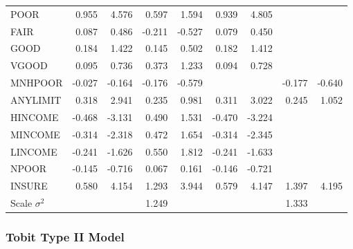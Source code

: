 \begin{table}[h]
\begin{tabular}{lrrrr|rrrr}
\hline
      POOR &      0.955 &      4.576 &      0.597 &      1.594 &      0.939 &      4.805 &            &            \\
      FAIR &      0.087 &      0.486 &     -0.211 &     -0.527 &      0.079 &      0.450 &            &            \\
      GOOD &      0.184 &      1.422 &      0.145 &      0.502 &      0.182 &      1.412 &            &            \\
     VGOOD &      0.095 &      0.736 &      0.373 &      1.233 &      0.094 &      0.728 &            &            \\
   MNHPOOR &     -0.027 &     -0.164 &     -0.176 &     -0.579 &            &            &     -0.177 &     -0.640 \\
  ANYLIMIT &      0.318 &      2.941 &      0.235 &      0.981 &      0.311 &      3.022 &      0.245 &      1.052 \\
  \hline
   HINCOME &     -0.468 &     -3.131 &      0.490 &      1.531 &     -0.470 &     -3.224 &            &            \\
   MINCOME &     -0.314 &     -2.318 &      0.472 &      1.654 &     -0.314 &     -2.345 &            &            \\
   LINCOME &     -0.241 &     -1.626 &      0.550 &      1.812 &     -0.241 &     -1.633 &            &            \\
     NPOOR &     -0.145 &     -0.716 &      0.067 &      0.161 &     -0.146 &     -0.721 &            &            \\
    INSURE &      0.580 &      4.154 &      1.293 &      3.944 &      0.579 &      4.147 &      1.397 &      4.195 \\
    \hline
     Scale $\sigma^2$&            &            &      1.249 &            &            &            &      1.333 &  \\
       \hline
\end{tabular}

\linetjed
\end{table}



\subsubsection*{Tobit Type II Model}

